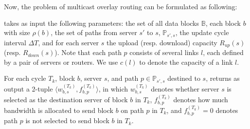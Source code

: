 Now, the problem of multicast overlay routing can be formulated as
following:

 \name takes as input the following parameters:
the set of all data blocks $\mathbb{B}$, each block $b$ with size
$\rho(b)$, the set of paths from server $s'$ to $s$,
$\mathbb{P}_{s',s}$, the update cycle interval $\Delta T$, and for
each server $s$ the upload (resp. download) capacity $R_{up}(s)$
(resp. $R_{down}(s)$). Note that each path $p$ consists of several
links $l$, each defined by a pair of servers or routers. We use
$c(l)$ to denote the capacity of a link $l$.

 For each cycle $T_{k}$, block $b$, server $s$, and
path $p\in\mathbb{P}_{s',s}$ destined to $s$, \name returns as output
a 2-tuple $\langle w^{(T_k)}_{b,s}, f_{b,p}^{(T_k)} \rangle$, in which $w^{(T_k)}_{b,s}$ denotes whether server $s$ is
selected as the destination server of block $b$ in $T_k$,
$f_{b,p}^{(T_k)}$ denotes how much bandwidth is allocated to send
block $b$ on path $p$ in $T_k$, and $f_{b,p}^{(T_k)}=0$ denotes
path $p$ is not selected to send block $b$ in $T_k$.


